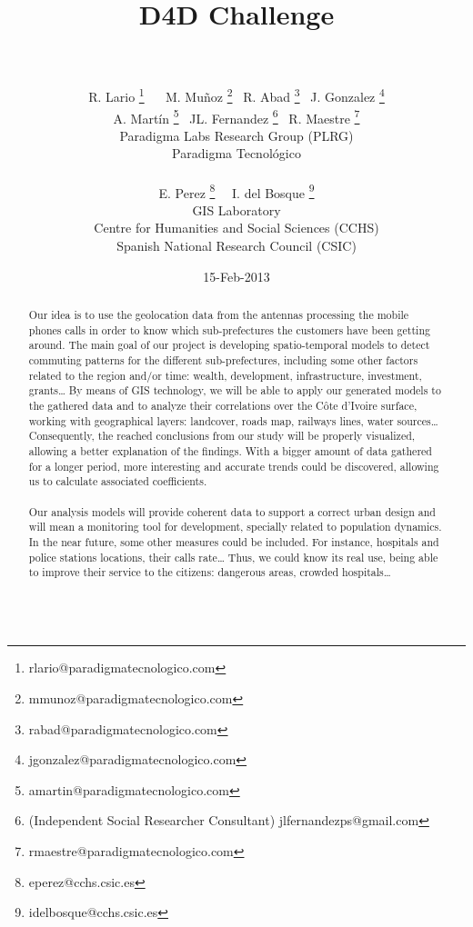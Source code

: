 \documentclass[a4paper,11pt]{article}
\begin{document}
\title{{\huge D4D Challenge} \\  \\ }

\author{{
              R. Lario  \footnote{rlario@paradigmatecnologico.com} \ \  %
				M. Muñoz  \footnote{mmunoz@paradigmatecnologico.com} \
				R. Abad  \footnote{rabad@paradigmatecnologico.com}  \
				J. Gonzalez  \footnote{jgonzalez@paradigmatecnologico.com}  \\
				A. Martín  \footnote{amartin@paradigmatecnologico.com}  \
				JL. Fernandez \footnote{(Independent Social Researcher Consultant) jlfernandezps@gmail.com}  \
				R. Maestre  \footnote{rmaestre@paradigmatecnologico.com} 
				\\\small Paradigma Labs Research Group (PLRG) \\\small Paradigma Tecnológico\\ \\
				E. Perez \footnote{eperez@cchs.csic.es}  \ \
				I. del Bosque  \footnote{idelbosque@cchs.csic.es} 
				\\\small GIS Laboratory \\\small Centre for Humanities and Social Sciences (CCHS) \\\small Spanish National Research Council (CSIC)
				}}

\date{15-Feb-2013}
\maketitle

\begin{abstract} 
Our idea is to use the geolocation data from the antennas processing the mobile phones calls in order to know which sub-prefectures the customers have been getting around. The main goal of our project is developing spatio-temporal models to detect commuting patterns for the different sub-prefectures, including some other factors related to the region and/or time: wealth, development, infrastructure, investment, grants…
By means of GIS technology, we will be able to apply our generated models to the gathered data and to analyze their correlations over the Côte d’Ivoire surface, working with geographical layers: landcover, roads map, railways lines, water sources… Consequently, the reached conclusions from our study will be properly visualized, allowing a better explanation of the findings. With a bigger amount of data gathered for a longer period, more interesting and accurate trends could be discovered, allowing us to calculate associated coefficients.
\\
\\
Our analysis models will provide coherent data to support a correct urban design and will mean a monitoring tool for development, specially related to population dynamics.
In the near future, some other measures could be included. For instance, hospitals and police stations locations, their calls rate… Thus, we could know its real use, being able to improve their service to the citizens: dangerous areas, crowded hospitals…
\\
\\
\end{abstract}
\end{document}
